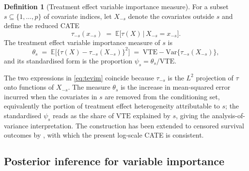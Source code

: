 \documentclass[11pt]{report}
\theoremstyle{plain}
\theoremstyle{definition}
\newtheorem{definition}[theorem]{Definition}
\theoremstyle{remark}
\newcommand{\E}{\mathbb{E}}
\newcommand{\1}{\mathds{1}}
\theoremstyle{plain}
\theoremstyle{remark}
\newcommand{\Var}{\mathrm{Var}}
\newcommand{\given}{\,\vert\,}
\newcommand{\vte}{\mathrm{VTE}}
\begin{document}
\begin{definition}[Treatment effect variable importance measure]
\label{def:tevim}
For a subset $s \subseteq \{1, \dots, p\}$ of covariate indices, let $X_{-s}$
denote the covariates outside $s$ and define the reduced CATE
\[
\tau_{-s}(x_{-s}) \;=\; \E\bigl[\tau(X) \given X_{-s} = x_{-s}\bigr].
\]
The treatment effect variable importance measure of $s$ is
\begin{equation}
\label{eq:tevim}
\theta_s \;=\; \E\bigl[\{\tau(X) - \tau_{-s}(X_{-s})\}^2\bigr]
        \;=\; \vte - \Var\{\tau_{-s}(X_{-s})\},
\end{equation}
and its standardised form is the proportion $\psi_s = \theta_s / \vte$.
\end{definition}

\noindent
The two expressions in \eqref{eq:tevim} coincide because $\tau_{-s}$ is the
$L^2$ projection of $\tau$ onto functions of $X_{-s}$. The measure $\theta_s$ is
the increase in mean-squared error incurred when the covariates in $s$ are
removed from the conditioning set, equivalently the portion of treatment effect
heterogeneity attributable to $s$; the standardised $\psi_s$ reads as the share
of $\vte$ explained by $s$, giving the analysis-of-variance interpretation. The
construction has been extended to censored survival outcomes by
\citet{ziersen2024}, with which the present log-scale CATE is consistent.

\subsection{Posterior inference for variable importance}
\label{subsec:vim-posterior}
\end{document}
